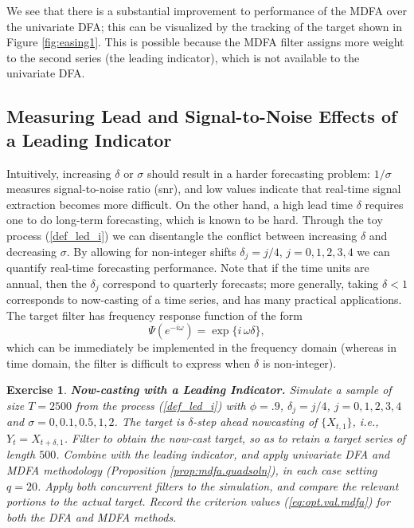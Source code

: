 \documentclass[a4paper]{book}
\newtheorem{Exercise}{Exercise}
\begin{document}
We see that there is a substantial improvement to performance of the MDFA over
 the univariate DFA; this can be visualized by the tracking of the target
 shown in Figure \ref{fig:easing1}.  This is possible because the MDFA filter
 assigns more weight to the second series (the leading indicator), which is
 not available to the univariate DFA.
 

\subsection{Measuring Lead and Signal-to-Noise Effects of a Leading Indicator}
 \label{lead_snr}

Intuitively, increasing $\delta$ or $\sigma$ should result in a harder forecasting
 problem: $1/ \sigma$ measures signal-to-noise ratio (snr), and low values indicate
 that real-time signal extraction becomes more difficult.  On the other hand,
 a high lead time $\delta$ requires one to do long-term forecasting, which is
 known to be hard.
 Through the toy process (\ref{def_led_i}) we can disentangle the conflict
 between increasing $\delta$ and decreasing $\sigma$.
  By allowing for  non-integer shifts $\delta_j=j/4$, $j=0,1,2,3,4$
 we can quantify real-time forecasting performance.  Note
 that if the time units are annual, then the $\delta_j$ correspond to quarterly
 forecasts; more generally, taking $\delta < 1$ corresponds to now-casting
 of a time series, and has many practical applications.
  The target filter has frequency response function of the form
\[
 \Psi (e^{-i \omega}) = \exp \{ i \, \omega \delta \},
\]
 which can be immediately be implemented in the frequency domain
 (whereas in time domain, the filter is difficult to express when $\delta$ is non-integer).
 

\begin{Exercise} {\bf Now-casting with a Leading Indicator.} \rm
\label{exer:nowmdfa-udfa}
 Simulate a sample of size $T=2500$ from the process (\ref{def_led_i}) with
 $\phi = .9$, $\delta_j=j/4$, $j=0,1,2,3,4$ and 
$\sigma = 0,0.1,0.5,1,2$.  The target is $\delta$-step
 ahead nowcasting of $\{ X_{t,1} \}$, i.e., $Y_t = X_{t+\delta,1}$.
 Filter to obtain the now-cast target, so as to retain a target series
 of length $500$.  Combine with the leading indicator, and 
  apply univariate DFA and MDFA methodology (Proposition \ref{prop:mdfa.quadsoln}),
 in each case setting $q=20$.  
  Apply both concurrent filters 
 to the simulation, and compare the relevant portions to the actual
 target.  Record the criterion values  (\ref{eq:opt.val.mdfa})
 for both the DFA and MDFA methods.
\end{Exercise}
\end{document}
